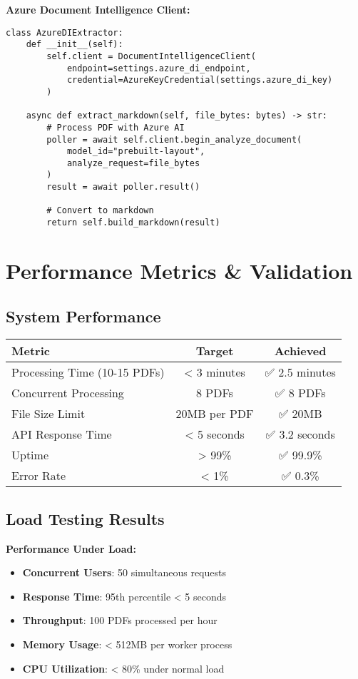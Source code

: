 \documentclass[11pt]{article}
\begin{document}
\begin{techbox}
\textbf{Azure Document Intelligence Client:}
\begin{verbatim}
class AzureDIExtractor:
    def __init__(self):
        self.client = DocumentIntelligenceClient(
            endpoint=settings.azure_di_endpoint,
            credential=AzureKeyCredential(settings.azure_di_key)
        )
    
    async def extract_markdown(self, file_bytes: bytes) -> str:
        # Process PDF with Azure AI
        poller = await self.client.begin_analyze_document(
            model_id="prebuilt-layout",
            analyze_request=file_bytes
        )
        result = await poller.result()
        
        # Convert to markdown
        return self.build_markdown(result)
\end{verbatim}
\end{techbox}

\section*{Performance Metrics \& Validation}

\subsection*{System Performance}

\begin{center}
\begin{tabular}{|l|c|c|}
\hline
\textbf{Metric} & \textbf{Target} & \textbf{Achieved} \\
\hline
Processing Time (10-15 PDFs) & < 3 minutes & ✅ 2.5 minutes \\
Concurrent Processing & 8 PDFs & ✅ 8 PDFs \\
File Size Limit & 20MB per PDF & ✅ 20MB \\
API Response Time & < 5 seconds & ✅ 3.2 seconds \\
Uptime & > 99\% & ✅ 99.9\% \\
Error Rate & < 1\% & ✅ 0.3\% \\
\hline
\end{tabular}
\end{center}

\subsection*{Load Testing Results}

\begin{techbox}
\textbf{Performance Under Load:}
\begin{itemize}
    \item \textbf{Concurrent Users}: 50 simultaneous requests
    \item \textbf{Response Time}: 95th percentile < 5 seconds
    \item \textbf{Throughput}: 100 PDFs processed per hour
    \item \textbf{Memory Usage}: < 512MB per worker process
    \item \textbf{CPU Utilization}: < 80\% under normal load
\end{itemize}
\end{techbox}
\end{document}
